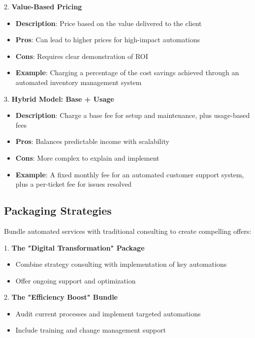 2. \textbf{Value-Based Pricing}
\begin{itemize}
    \item \textbf{Description}: Price based on the value delivered to the client
    \item \textbf{Pros}: Can lead to higher prices for high-impact automations
    \item \textbf{Cons}: Requires clear demonstration of ROI
    \item \textbf{Example}: Charging a percentage of the cost savings achieved through an automated inventory management system
\end{itemize}

3. \textbf{Hybrid Model: Base + Usage}
\begin{itemize}
    \item \textbf{Description}: Charge a base fee for setup and maintenance, plus usage-based fees
    \item \textbf{Pros}: Balances predictable income with scalability
    \item \textbf{Cons}: More complex to explain and implement
    \item \textbf{Example}: A fixed monthly fee for an automated customer support system, plus a per-ticket fee for issues resolved
\end{itemize}


\subsection{Packaging Strategies}

Bundle automated services with traditional consulting to create compelling offers:

1. \textbf{The "Digital Transformation" Package}
\begin{itemize}
    \item Combine strategy consulting with implementation of key automations
    \item Offer ongoing support and optimization
\end{itemize}

2. \textbf{The "Efficiency Boost" Bundle}
\begin{itemize}
    \item Audit current processes and implement targeted automations
    \item Include training and change management support
\end{itemize}

